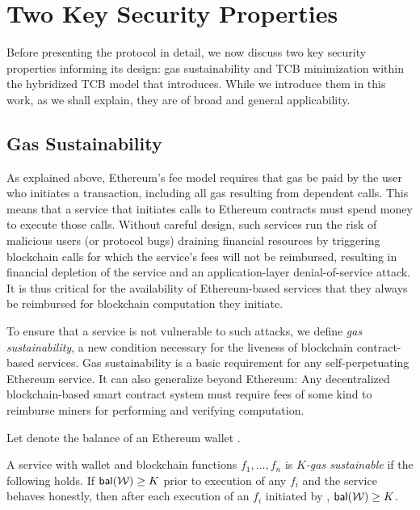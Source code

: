 \section{Two Key Security Properties}

Before presenting the \tc protocol in detail,  we now discuss two key security properties informing its design: gas sustainability and TCB minimization within the hybridized TCB model that \tc introduces. While we introduce them in this work, as we shall explain, they are of broad and general applicability.

\subsection{Gas Sustainability}
\label{sec:gas-sustainability}

As explained above, Ethereum's fee model requires that gas be paid by the user who initiates a transaction, including all gas resulting from dependent calls. 
This means that a service that initiates calls to Ethereum contracts must spend money to execute those calls.
Without careful design, such services run the risk of malicious users (or protocol bugs) draining financial resources by triggering blockchain calls for which the service's fees will not be reimbursed, resulting in financial depletion of the service and an application-layer denial-of-service attack.
It is thus critical for the availability of Ethereum-based services that they always be reimbursed for blockchain computation they initiate.

To ensure that a service is not vulnerable to such attacks, we define \emph{gas sustainability}, a new condition necessary for the liveness of blockchain contract-based services. Gas sustainability is a basic requirement for any self-perpetuating Ethereum service. It can also generalize beyond Ethereum: Any decentralized blockchain-based smart contract system must require fees of some kind to reimburse miners for performing and verifying computation. 

Let \bal{\wallet} denote the balance of an Ethereum wallet \wallet.

\begin{definition}
  \label{def:gas-sustainability}
  A service with wallet \wallet and blockchain functions $f_1, \dotsc, f_n$ is \emph{$K$-gas sustainable} if the following holds.
If $\bal{\wallet} \geq K$ prior to execution of any $f_i$ and the service behaves honestly,
  then after each execution of an $f_i$ initiated by \wallet, $\bal{\wallet} \geq K$.
\end{definition}

